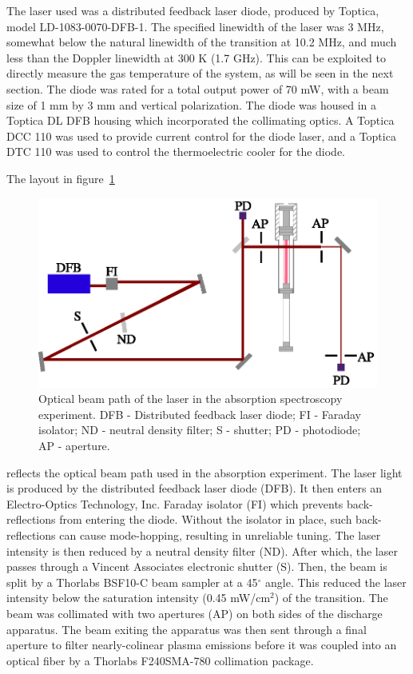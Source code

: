 The laser used was a distributed feedback laser diode, produced by Toptica,
model LD-1083-0070-DFB-1. The specified linewidth of the laser was 3 MHz,
somewhat below the natural linewidth of the transition at 10.2 MHz, and much
less than the Doppler linewidth at 300 K (1.7 GHz). This can be exploited to
directly measure the gas temperature of the system, as will be seen in the next
section. The diode was rated for a total output power of 70 mW, with a beam size
of 1 mm by 3 mm and vertical polarization. The diode was housed in a Toptica DL
DFB housing which incorporated the collimating optics. A Toptica DCC 110 was
used to provide current control for the diode laser, and a Toptica DTC 110 was
used to control the thermoelectric cooler for the diode.

The layout in figure~\ref{fig:laser}
\begin{figure}
  \centering
  \includegraphics{./chapters/metastables/figures/laser.eps}
  \caption{Optical beam path of the laser in the absorption spectroscopy
  experiment. DFB - Distributed feedback laser diode; FI - Faraday isolator; ND -
  neutral density filter; S - shutter; PD - photodiode; AP - aperture.}
  \label{fig:laser}
\end{figure}
reflects the optical beam path used in the absorption experiment. The laser
light is produced by the distributed feedback laser diode (DFB). It then enters
an Electro-Optics Technology, Inc. Faraday isolator (FI) which prevents
back-reflections from entering the diode. Without the isolator in place, such
back-reflections can cause mode-hopping, resulting in unreliable tuning. The
laser intensity is then reduced by a neutral density filter (ND). After which,
the laser passes through a Vincent Associates electronic shutter (S). Then, the
beam is split by a Thorlabs BSF10-C beam sampler at a 45$^\circ$ angle. This
reduced the laser intensity below the saturation intensity (0.45 mW/cm$^2$) of
the transition. The beam was collimated with two apertures (AP) on both sides of
the discharge apparatus. The beam exiting the apparatus was then sent through a
final aperture to filter nearly-colinear plasma emissions before it was coupled
into an optical fiber by a Thorlabs F240SMA-780 collimation package.

